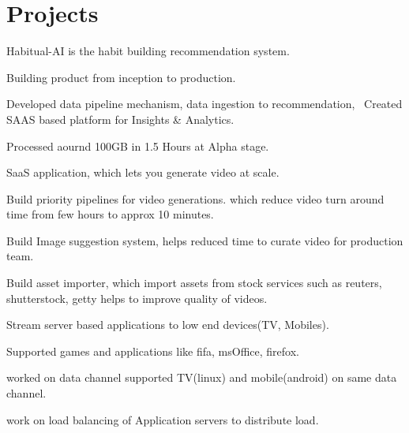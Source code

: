 \documentclass[]{deedy-resume-openfont}
\begin{document}
\hfill
\begin{minipage}[t]{0.66\textwidth} 


\section{Projects}
\vspace{\topsep} %
\begin{tightemize}
\item Habitual-AI is the habit building recommendation system.
\item Building product from inception to production.
\item Developed data pipeline mechanism, data ingestion to recommendation, \
Created SAAS based platform for Insights \& Analytics.
\item Processed aournd 100GB in 1.5 Hours at Alpha stage.
\end{tightemize}
\sectionsep

\begin{tightemize}
\item SaaS application, which lets you generate video at scale.
\item Build priority pipelines for video generations. which reduce video turn around time from few hours to approx 10 minutes.
\item Build Image suggestion system, helps reduced time to curate video for production team.
\item Build asset importer, which import assets from stock services such as reuters, shutterstock, getty helps to improve quality of videos.
\end{tightemize}
\sectionsep

\begin{tightemize}
\item Stream server based applications to low end devices(TV, Mobiles).
\item Supported games and applications like fifa, msOffice, firefox.
\item worked on data channel supported TV(linux) and mobile(android) on same data channel.
\item work on load balancing of Application servers to distribute load.
\end{tightemize}
\sectionsep


\end{minipage}
\end{document}
